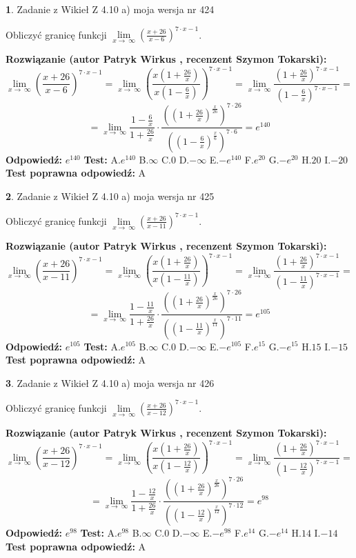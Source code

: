 \documentclass[12pt, a4paper]{article}
\theoremstyle{definition} %
\newtheorem{zad}{}
\newcommand{\zadStart}[1]{\begin{zad}#1\newline}
\newcommand{\zadStop}{\end{zad}}
\newcommand{\rozwStart}[2]{\noindent \textbf{Rozwiązanie (autor #1 , recenzent #2): }\newline}
\newcommand{\rozwStop}{\newline}
\newcommand{\odpStart}{\noindent \textbf{Odpowiedź:}\newline}
\newcommand{\odpStop}{\newline}
\newcommand{\testStart}{\noindent \textbf{Test:}\newline}
\newcommand{\testStop}{\newline}
\newcommand{\kluczStart}{\noindent \textbf{Test poprawna odpowiedź:}\newline}
\newcommand{\kluczStop}{\newline}
\begin{document}
\zadStart{Zadanie z Wikieł Z 4.10 a) moja wersja nr 424}

Obliczyć granicę funkcji  $\lim\limits_{x\to\ \infty}(\frac{x+26}{x-6})^{7\cdot x-1}$.
\zadStop
\rozwStart{Patryk Wirkus}{Szymon Tokarski}
$$\lim\limits_{x\to\ \infty}(\frac{x+26}{x-6})^{7\cdot x-1} = \lim\limits_{x\to\ \infty}(\frac{x(1+\frac{26}{x})}{x(1-\frac{6}{x})})^{7\cdot x-1}=\lim\limits_{x\to\ \infty}\frac{(1+\frac{26}{x})^{7\cdot x-1}}{(1-\frac{6}{x})^{7\cdot x-1}}=$$
$$=\lim\limits_{x\to\ \infty}\frac{1-\frac{6}{x}}{1+\frac{26}{x}}\cdot\frac{((1+\frac{26}{x})^{\frac{x}{26}})^{7\cdot26}}{((1-\frac{6}{x})^{\frac{x}{6}})^{7\cdot6}}=e^{140}$$
\rozwStop
\odpStart
$e^{140}$
\odpStop
\testStart
A.$e^{140}$ B.$\infty$ C.$0$ D.$-\infty$ E.$-e^{140}$
F.$e^{20}$ G.$-e^{20}$
H.$20$
I.$-20$
\testStop
\kluczStart
A
\kluczStop



\zadStart{Zadanie z Wikieł Z 4.10 a) moja wersja nr 425}

Obliczyć granicę funkcji  $\lim\limits_{x\to\ \infty}(\frac{x+26}{x-11})^{7\cdot x-1}$.
\zadStop
\rozwStart{Patryk Wirkus}{Szymon Tokarski}
$$\lim\limits_{x\to\ \infty}(\frac{x+26}{x-11})^{7\cdot x-1} = \lim\limits_{x\to\ \infty}(\frac{x(1+\frac{26}{x})}{x(1-\frac{11}{x})})^{7\cdot x-1}=\lim\limits_{x\to\ \infty}\frac{(1+\frac{26}{x})^{7\cdot x-1}}{(1-\frac{11}{x})^{7\cdot x-1}}=$$
$$=\lim\limits_{x\to\ \infty}\frac{1-\frac{11}{x}}{1+\frac{26}{x}}\cdot\frac{((1+\frac{26}{x})^{\frac{x}{26}})^{7\cdot26}}{((1-\frac{11}{x})^{\frac{x}{11}})^{7\cdot11}}=e^{105}$$
\rozwStop
\odpStart
$e^{105}$
\odpStop
\testStart
A.$e^{105}$ B.$\infty$ C.$0$ D.$-\infty$ E.$-e^{105}$
F.$e^{15}$ G.$-e^{15}$
H.$15$
I.$-15$
\testStop
\kluczStart
A
\kluczStop



\zadStart{Zadanie z Wikieł Z 4.10 a) moja wersja nr 426}

Obliczyć granicę funkcji  $\lim\limits_{x\to\ \infty}(\frac{x+26}{x-12})^{7\cdot x-1}$.
\zadStop
\rozwStart{Patryk Wirkus}{Szymon Tokarski}
$$\lim\limits_{x\to\ \infty}(\frac{x+26}{x-12})^{7\cdot x-1} = \lim\limits_{x\to\ \infty}(\frac{x(1+\frac{26}{x})}{x(1-\frac{12}{x})})^{7\cdot x-1}=\lim\limits_{x\to\ \infty}\frac{(1+\frac{26}{x})^{7\cdot x-1}}{(1-\frac{12}{x})^{7\cdot x-1}}=$$
$$=\lim\limits_{x\to\ \infty}\frac{1-\frac{12}{x}}{1+\frac{26}{x}}\cdot\frac{((1+\frac{26}{x})^{\frac{x}{26}})^{7\cdot26}}{((1-\frac{12}{x})^{\frac{x}{12}})^{7\cdot12}}=e^{98}$$
\rozwStop
\odpStart
$e^{98}$
\odpStop
\testStart
A.$e^{98}$ B.$\infty$ C.$0$ D.$-\infty$ E.$-e^{98}$
F.$e^{14}$ G.$-e^{14}$
H.$14$
I.$-14$
\testStop
\kluczStart
A
\kluczStop
\end{document}
